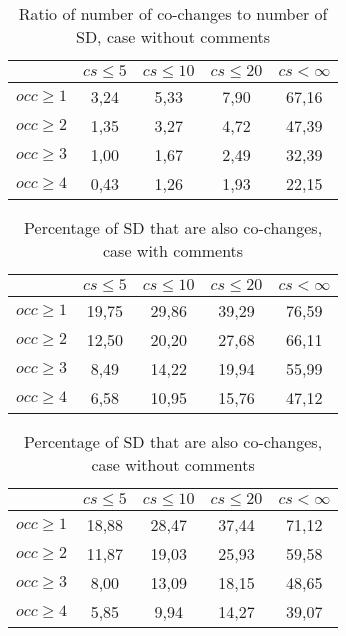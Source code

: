\begin{table}[!h]
\renewcommand{\arraystretch}{1}
\caption{Ratio of number of co-changes to number of SD, case without comments}
\label{tab:ratio:nocomm}
\centering

\begin{tabular}{|c|c|c|c|c|}
\hline
	      &	$cs\leq 5$	&	$cs\leq 10$	&	$cs\leq 20$	&	$cs< \infty$	\\
\hline
$occ\geq 1$	&	3,24	&	5,33	&	7,90	&	67,16	\\
$occ\geq 2$	&	1,35	&	3,27	&	4,72	&	47,39	\\
$occ\geq 3$	&	1,00	&	1,67	&	2,49	&	32,39	\\
$occ\geq 4$	&	0,43	&	1,26	&	1,93	&	22,15	\\
\hline
\end{tabular}
\end{table}

\begin{table}[!h]
\renewcommand{\arraystretch}{1}
\caption{Percentage of SD that are also co-changes, case with comments}
\label{tab:percSD:comm}
\centering

\begin{tabular}{|c|c|c|c|c|}
\hline
	      &	$cs\leq 5$	&	$cs\leq 10$	&	$cs\leq 20$	&	$cs< \infty$	\\
\hline
$occ\geq 1$	&	19,75	&	29,86	&	39,29	&	76,59	\\
$occ\geq 2$	&	12,50	&	20,20	&	27,68	&	66,11	\\
$occ\geq 3$	&	8,49	&	14,22	&	19,94	&	55,99	\\
$occ\geq 4$	&	6,58	&	10,95	&	15,76	&	47,12	\\
\hline
\end{tabular}
\end{table}

\begin{table}[!h]
\renewcommand{\arraystretch}{1}
\caption{Percentage of SD that are also co-changes, case without comments}
\label{tab:percSD:nocomm}
\centering

\begin{tabular}{|c|c|c|c|c|}
\hline
	      &	$cs\leq 5$	&	$cs\leq 10$	&	$cs\leq 20$	&	$cs< \infty$	\\
\hline
$occ\geq 1$	&	18,88	&	28,47	&	37,44	&	71,12	\\
$occ\geq 2$	&	11,87	&	19,03	&	25,93	&	59,58	\\
$occ\geq 3$	&	8,00	&	13,09	&	18,15	&	48,65	\\
$occ\geq 4$	&	5,85	&	9,94	&	14,27	&	39,07	\\
\hline
\end{tabular}
\end{table}

